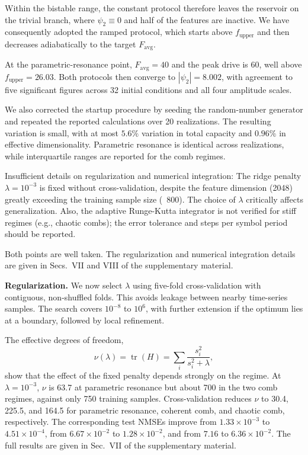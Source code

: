 \documentclass{ar2rc}
\begin{document}
Within the bistable range, the constant protocol therefore leaves the reservoir on the trivial branch, where $\psi_2\equiv0$ and half of the features are inactive. We have consequently adopted the ramped protocol, which starts above $f_{\mathrm{upper}}$ and then decreases adiabatically to the target $F_{\mathrm{avg}}$.

At the parametric-resonance point, $F_{\mathrm{avg}}=40$ and the peak drive is $60$, well above $f_{\mathrm{upper}}=26.03$. Both protocols then converge to $|\psi_2|=8.002$, with agreement to five significant figures across 32 initial conditions and all four amplitude scales.

We also corrected the startup procedure by seeding the random-number generator and repeated the reported calculations over 20 realizations. The resulting variation is small, with at most $5.6\%$ variation in total capacity and $0.96\%$ in effective dimensionality. Parametric resonance is identical across realizations, while interquartile ranges are reported for the comb regimes.

\RC \label{rev:2.5}Insufficient details on regularization and numerical integration: The ridge penalty $\lambda={10}^{-3}$ is fixed without cross-validation, despite the feature dimension (2048) greatly exceeding the training sample size (~800). The choice of $\lambda$ critically affects generalization. Also, the adaptive Runge-Kutta integrator is not verified for stiff regimes (e.g., chaotic combs); the error tolerance and steps per symbol period should be reported.

\AR Both points are well taken. The regularization and numerical integration details are given in Secs.~VII and VIII of the supplementary material.

\textbf{Regularization.} We now select $\lambda$ using five-fold cross-validation with contiguous, non-shuffled folds. This avoids leakage between nearby time-series samples. The search covers $10^{-8}$ to $10^{6}$, with further extension if the optimum lies at a boundary, followed by local refinement.

The effective degrees of freedom,
\begin{equation}
	\nu(\lambda)=\operatorname{tr}(H)=\sum_i\frac{s_i^2}{s_i^2+\lambda},
\end{equation}
show that the effect of the fixed penalty depends strongly on the regime. At $\lambda=10^{-3}$, $\nu$ is 63.7 at parametric resonance but about 700 in the two comb regimes, against only 750 training samples. Cross-validation reduces $\nu$ to 30.4, 225.5, and 164.5 for parametric resonance, coherent comb, and chaotic comb, respectively. The corresponding test NMSEs improve from $1.33\times10^{-3}$ to $4.51\times10^{-4}$, from $6.67\times10^{-2}$ to $1.28\times10^{-2}$, and from $7.16$ to $6.36\times10^{-2}$. The full results are given in Sec.~VII of the supplementary material.
\end{document}
